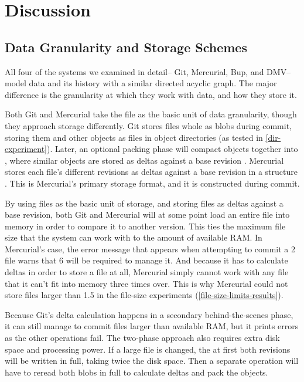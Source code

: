 \chapter{Discussion}


\section{Data Granularity and Storage Schemes}
\label{chunk-then-recombine}

All four of the systems we examined in detail-- Git, Mercurial, Bup, and
\gls{DMV}-- model data and its history with a similar directed acyclic graph.
The major difference is the granularity at which they work with data, and how
they store it.

Both Git and Mercurial take the file as the basic unit of data granularity,
though they approach storage differently. Git stores files whole as \glspl{blob}
during \gls{commit}, storing them and other objects as files in object
directories (as tested in \autoref{dir-experiment}). Later, an optional packing
phase will compact objects together into , where similar
objects are stored as deltas against a base revision \cite[Section
10.4]{git_book}. Mercurial stores each file's different revisions as deltas
   against a base revision in a  structure \cite[Chapter
   4]{hgbook}. This is Mercurial's primary storage format, and it is constructed
   during \gls{commit}.

By using files as the basic unit of storage, and storing files as deltas against
a base revision, both Git and Mercurial will at some point load an entire file
into memory in order to compare it to another version. This ties the maximum
file size that the system can work with to the amount of available RAM. In
Mercurial's case, the error message that appears when attempting to \gls{commit} a
\SI{2}{\gib} file warns that \SI{6}{\gib} will be required to manage it. And
because it has to calculate deltas in order to store a file at all, Mercurial
simply cannot work with any file that it can't fit into memory three times over.
This is why Mercurial could not store files larger than \SI{1.5}{\gib} in the
file-size experiments (\autoref{file-size-limits-results}).

Because Git's delta calculation happens in a secondary behind-the-scenes phase,
it can still manage to \gls{commit} files larger than available RAM, but it
prints errors as the other operations fail. The two-phase approach also requires
extra disk space and processing power. If a large file is changed, the at first
both revisions will be written in full, taking twice the disk space. Then a
separate operation will have to reread both \glspl{blob} in full to calculate
deltas and pack the objects.

